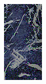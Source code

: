 \begin{figure}[]
\begin{subfigure}{0.6\textwidth}
\begin{subfigure}{0.48\textwidth}
\begin{subfigure}{0.32\textwidth}
                \includegraphics[width=\textwidth]{images/04-experiment02/human/marble/pixel_proj_crop_red.jpeg}
                \caption*{}
            \end{subfigure}

\end{subfigure}
\end{subfigure}
\end{figure}
